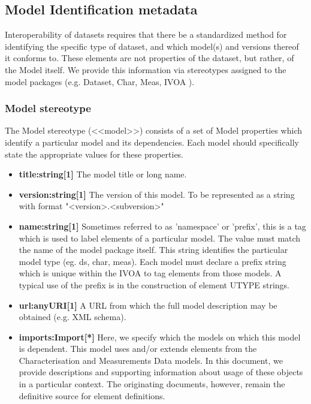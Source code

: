 \pagebreak
\subsection{Model Identification metadata}
\label{sect:stereotypes}

Interoperability of datasets requires that there be a standardized method for
identifying the specific type of dataset, and which model(s) and versions
thereof it conforms to. These elements are not properties of the dataset, but
rather, of the Model itself. We provide this information via stereotypes
assigned to the model packages (e.g. Dataset, Char, Meas, IVOA ).

  \subsubsection{Model stereotype}
  The Model stereotype (<<model>>) consists of a set of Model properties which
  identify a particular model and its dependencies. Each model should
  specifically state the appropriate values for these properties.

  \begin{itemize}
  \item \textbf{title:string[1]} \newline
    The model title or long name.
  \item \textbf{version:string[1]} \newline
    The version of this model. To be represented as a string with format "<version>.<subversion>"
  \item \textbf{name:string[1]} \newline
    Sometimes referred to as 'namespace’ or 'prefix', this is a tag which is
    used to label elements of a particular model. The value must match the name of
    the model package itself. This string identifies the particular model type 
    (eg. ds, char, meas). Each model must declare a prefix string which is
    unique within the IVOA to tag elements from those models. A typical use of the
    prefix is in the construction of element UTYPE strings.
  \item \textbf{url:anyURI[1]} \newline
    A URL from which the full model description may be obtained (e.g. XML schema).
  \item \textbf{imports:Import[*]} \newline
    Here, we specify which the models on which this model is dependent. This
    model uses and/or extends elements from the Characterisation and Measurements
    Data models. In this document, we provide descriptions and supporting
    information about usage of these objects in a particular context. The
    originating documents, however, remain the definitive source for element definitions.
  \end{itemize}

